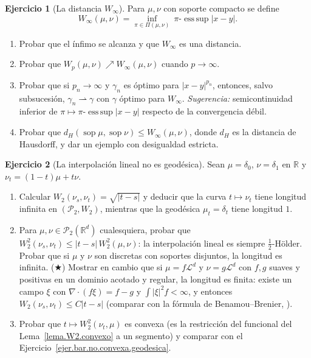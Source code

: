 \documentclass[12pt, a4paper]{amsbook}
\def\sop{\operatorname {\mathrm{sop}}}
\newcommand{\R}{{\mathbb R}}
\newcommand{\LL}{{\mathcal L}}
\theoremstyle{remark}
\theoremstyle{definition}
\newtheorem{ejercicio}{Ejercicio}[chapter]
\numberwithin{section}{chapter}
\numberwithin{subsection}{section}
\numberwithin{equation}{section}
\numberwithin{figure}{chapter}
\begin{document}
\begin{ejercicio}[La distancia $W_\infty$]\label{ejer.Winfty}
Para $\mu,\nu$ con soporte compacto se define
\[
W_\infty(\mu,\nu)=\inf_{\pi\in\Pi(\mu,\nu)}\ \pi\text{-}\operatorname{ess\,sup}|x-y|.
\]
\begin{enumerate}[label=(\alph*)]
\item Probar que el ínfimo se alcanza y que $W_\infty$ es una distancia.
\item Probar que $W_p(\mu,\nu)\nearrow W_\infty(\mu,\nu)$ cuando
$p\to\infty$.
\item Probar que si $p_n\to\infty$ y $\gamma_n$ es óptimo para $|x-y|^{p_n}$,
entonces, salvo subsucesión, $\gamma_n\rightharpoonup\gamma$ con $\gamma$
óptimo para $W_\infty$. \emph{Sugerencia:} semicontinuidad inferior de
$\pi\mapsto\pi$-$\operatorname{ess\,sup}|x-y|$ respecto de la convergencia
débil.
\item Probar que $d_H(\sop\mu,\sop\nu)\le W_\infty(\mu,\nu)$, donde $d_H$ es
la distancia de Hausdorff, y dar un ejemplo con desigualdad estricta.
\end{enumerate}
\end{ejercicio}

\begin{ejercicio}[La interpolación lineal no es geodésica]\label{ejer.Wp.lineal}
Sean $\mu=\delta_0$, $\nu=\delta_1$ en $\R$ y $\nu_t=(1-t)\mu+t\nu$.
\begin{enumerate}[label=(\alph*)]
\item Calcular $W_2(\nu_s,\nu_t)=\sqrt{|t-s|}$ y deducir que la curva
$t\mapsto\nu_t$ tiene longitud infinita en $(\mathcal P_2,W_2)$, mientras que
la geodésica $\mu_t=\delta_t$ tiene longitud $1$.
\item Para $\mu,\nu\in\mathcal P_2(\R^d)$ cualesquiera, probar que
$W_2^2(\nu_s,\nu_t)\le|t-s|\,W_2^2(\mu,\nu)$: la interpolación lineal es
siempre $\frac12$-Hölder. Probar que si $\mu$ y $\nu$ son discretas con
soportes disjuntos, la longitud es infinita. ($\bigstar$) Mostrar en cambio
que si $\mu=f\LL^d$ y $\nu=g\LL^d$ con $f,g$ suaves y positivas en un dominio
acotado y regular, la longitud es finita: existe un campo $\xi$ con
$\nabla\cdot(f\xi)=f-g$ y $\int|\xi|^2f<\infty$, y entonces
$W_2(\nu_s,\nu_t)\le C|t-s|$ (comparar con la fórmula de Benamou--Brenier,
\cite[Sec.~5.4]{Santambrogio}).
\item Probar que $t\mapsto W_2^2(\nu_t,\mu)$ es convexa (es la restricción
del funcional del Lema~\ref{lema.W2.convexo} a un segmento) y comparar con
el Ejercicio~\ref{ejer.bar.no.convexa.geodesica}.
\end{enumerate}
\end{ejercicio}
\end{document}
